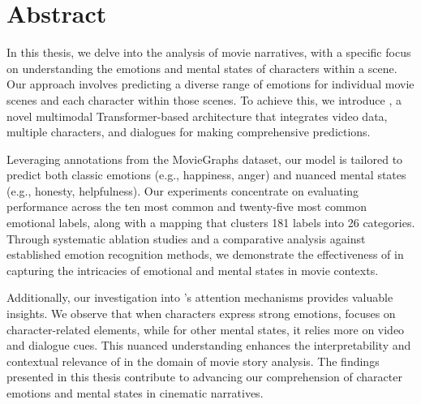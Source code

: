 \chapter*{Abstract}
\label{ch:abstract}
In this thesis, we delve into the analysis of movie narratives, with a specific focus on understanding the emotions and mental states of characters within a scene. Our approach involves predicting a diverse range of emotions for individual movie scenes and each character within those scenes. To achieve this, we introduce \modelname, a novel multimodal Transformer-based architecture that integrates video data, multiple characters, and dialogues for making comprehensive predictions.

Leveraging annotations from the MovieGraphs dataset, our model is tailored to predict both classic emotions (e.g., happiness, anger) and nuanced mental states (e.g., honesty, helpfulness). Our experiments concentrate on evaluating performance across the ten most common and twenty-five most common emotional labels, along with a mapping that clusters 181 labels into 26 categories. Through systematic ablation studies and a comparative analysis against established emotion recognition methods, we demonstrate the effectiveness of \modelname{} in capturing the intricacies of emotional and mental states in movie contexts.

Additionally, our investigation into \modelname's attention mechanisms provides valuable insights. We observe that when characters express strong emotions, \modelname{} focuses on character-related elements, while for other mental states, it relies more on video and dialogue cues. This nuanced understanding enhances the interpretability and contextual relevance of \modelname{} in the domain of movie story analysis. The findings presented in this thesis contribute to advancing our comprehension of character emotions and mental states in cinematic narratives.
